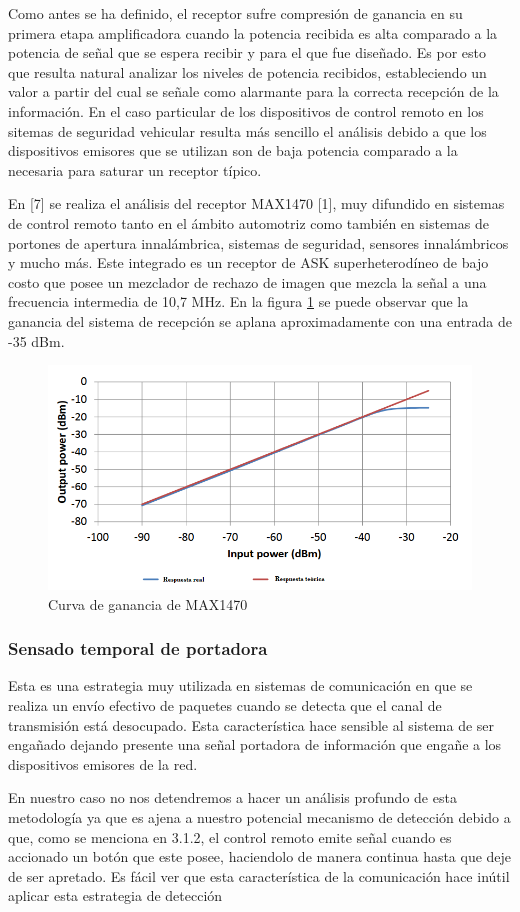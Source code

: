 \documentclass[12pt]{report}
\begin{document}
Como antes se ha definido, el receptor sufre compresión de ganancia en su primera etapa amplificadora cuando la potencia recibida es alta
comparado a la potencia de señal que se espera recibir y para el que fue diseñado. Es por esto que resulta natural analizar los niveles de
potencia recibidos, estableciendo un valor a partir del cual se señale como alarmante para la correcta recepción de la información. 
En el caso particular de los dispositivos de control remoto en los sitemas de seguridad vehicular resulta más sencillo el análisis 
debido a que los dispositivos emisores que se utilizan son de baja potencia comparado a la necesaria para saturar un receptor típico.\par
En [7] se realiza el análisis del receptor MAX1470 [1], muy difundido en sistemas de control remoto tanto en el ámbito automotriz como también
en sistemas de portones de apertura innalámbrica, sistemas de seguridad, sensores innalámbricos y mucho más. Este integrado es un receptor de 
ASK superheterodíneo de bajo costo que posee un mezclador de rechazo de imagen que mezcla la señal a una frecuencia intermedia de 10,7 MHz. En
la figura \ref{compresion_max} se puede observar que la ganancia del sistema de recepción se aplana aproximadamente con una entrada de -35 dBm.

\begin{figure}[htb]
	\centering
	\includegraphics[scale=0.5]{compresion_max.png}
    \caption{Curva de ganancia de MAX1470}
	\label{compresion_max}
\end{figure}


\subsubsection{Sensado temporal de portadora}

Esta es una estrategia muy utilizada en sistemas de comunicación en que se realiza un envío efectivo de paquetes cuando se detecta que el canal 
de transmisión está desocupado. Esta característica hace sensible al sistema de ser engañado dejando presente una señal portadora de información
que engañe a los dispositivos emisores de la red.\par
En nuestro caso no nos detendremos a hacer un análisis profundo de esta metodología ya que es ajena a nuestro potencial mecanismo de detección
debido a que, como se menciona en 3.1.2, el control remoto emite señal cuando es accionado un botón que este posee, haciendolo de manera continua
hasta que deje de ser apretado. Es fácil ver que esta característica de la comunicación hace inútil aplicar esta estrategia de detección
\end{document}
